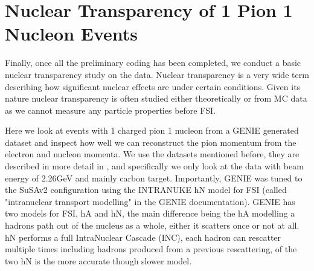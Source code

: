 \documentclass[a4paper,12pt]{article}
\newcommand{\verbb}[1]{\text{\Verb|#1|}}
\begin{document}

\section{Nuclear Transparency of 1 Pion 1 Nucleon Events}
Finally, once all the preliminary coding has been completed, we conduct a basic nuclear transparency study on the data.
Nuclear transparency is a very wide term describing how significant nuclear effects are under certain conditions.
Given its nature nuclear transparency is often studied either theoretically or from MC data as we cannot measure any particle properties before FSI.

Here we look at events with 1 charged pion 1 nucleon from a GENIE generated dataset and inspect how well we can reconstruct the pion momentum from the electron and nucleon momenta.
We use the datasets mentioned before, they are described in more detail in \cite{papadopoulouLeptonNucleusScatteringMeasurements2023}, and specifically we only look at the data with beam energy of 2.26\si{GeV} and mainly carbon target.
Importantly, GENIE was tuned to the SuSAv2 configuration using the INTRANUKE hN model for FSI (called "intranuclear transport modelling" in the GENIE documentation\cite{andreopoulosGENIENeutrinoMonte2015}).
GENIE has two models for FSI, hA and hN, the main difference being the hA modelling a hadrons path out of the nucleus as a whole, either it scatters once or not at all.
hN performs a full IntraNuclear Cascade (INC), each hadron can rescatter multiple times including hadrons produced from a previous rescattering, of the two hN is the more accurate though slower model\cite{andreopoulosGENIENeutrinoMonte2015}.
\end{document}
